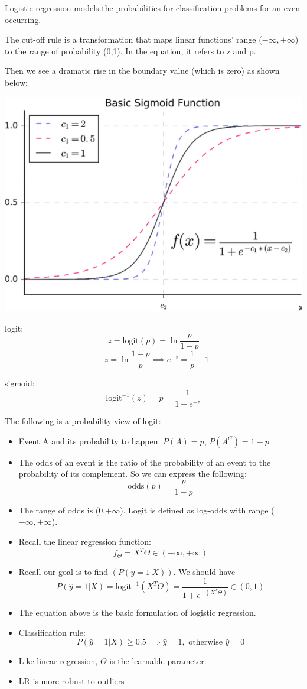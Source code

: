 \documentclass[letterpaper,12pt]{article}
\begin{document}
Logistic regression models the probabilities for classification problems for an
even occurring.

The cut-off rule is a transformation that maps linear functions' range
($-\infty,+\infty$) to the range of probability (0,1). In the equation, it
refers to z and p.

Then we see a dramatic rise in the boundary value (which is zero) as shown
below:

\includegraphics*{./Image/Basic Sigmoid Funciton.png}

logit:
\[
    z=\text{logit}(p)=\ln\frac{p}{1-p}
\]
\[
    -z=\ln\frac{1-p}{p}\implies e^{-z}=\frac{1}{p}-1
\]

sigmoid:
\[
    \text{logit}^{-1}(z)=p=\frac{1}{1+e^{-z}}
\]

The following is a probability view of logit:
\begin{itemize}
    \item Event A and its probability to happen: $P(A)=p$, $P(A^C)=1-p$
    \item The odds of an event is the ratio of the probability of an event to the
          probability of its complement. So we can express the following:
          \[
              \text{odds}(p)=\frac{p}{1-p}
          \]
    \item The range of odds is (0,$+\infty$). Logit is defined as log-odds with range
          ($-\infty,+\infty$).
    \item Recall the linear regression function:
          \[
              f_{\Theta}=X^T\Theta\in(-\infty,+\infty)
          \]
    \item Recall our goal is to find $(P(y=1|X))$. We should have
          \[
              P(\hat{y}=1|X)=\text{logit}^{-1}(X^T\Theta)=\frac{1}{1+e^{-(X^T\Theta)}}    \in(0,1)
          \]
    \item  The equation above is the basic formulation of logistic regression.
    \item Classification rule:
          \[
              P(\hat{y}=1|X) \ge0.5 \implies \hat{y}=1,\text{ otherwise } \hat{y}=0
          \]
    \item Like linear regression, $\Theta$ is the learnable parameter.
    \item LR is more robust to outliers
\end{itemize}
\end{document}
